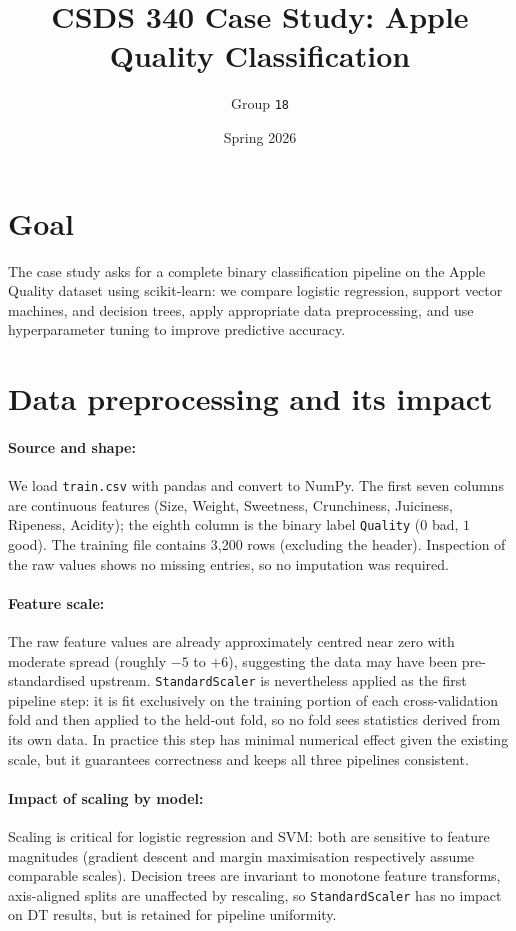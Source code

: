 \documentclass[11pt]{article}
\title{CSDS 340 Case Study: Apple Quality Classification}
\author{Group \texttt{18}}
\date{Spring 2026}
\begin{document}
\maketitle



\section{Goal}

The case study asks for a complete binary classification pipeline on the Apple Quality dataset using scikit-learn: we compare logistic regression, support vector machines, and decision trees, apply appropriate data preprocessing, and use hyperparameter tuning to improve predictive accuracy.


\section{Data preprocessing and its impact}

\paragraph{Source and shape:}
We load \texttt{train.csv} with pandas and convert to NumPy.
The first seven columns are continuous features (Size, Weight, Sweetness, Crunchiness, Juiciness, Ripeness, Acidity); the eighth column is the binary label \texttt{Quality} ($0$ bad, $1$ good).
The training file contains 3{,}200 rows (excluding the header).
Inspection of the raw values shows no missing entries, so no imputation was required.

\paragraph{Feature scale:}
The raw feature values are already approximately centred near zero with moderate spread (roughly $-5$ to $+6$), suggesting the data may have been pre-standardised upstream.
\texttt{StandardScaler} is nevertheless applied as the first pipeline step: it is fit exclusively on the training portion of each cross-validation fold and then applied to the held-out fold, so no fold sees statistics derived from its own data.
In practice this step has minimal numerical effect given the existing scale, but it guarantees correctness and keeps all three pipelines consistent.

\paragraph{Impact of scaling by model:}
Scaling is critical for logistic regression and SVM: both are sensitive to feature magnitudes (gradient descent and margin maximisation respectively assume comparable scales).
Decision trees are invariant to monotone feature transforms, axis-aligned splits are unaffected by rescaling, so \texttt{StandardScaler} has no impact on DT results, but is retained for pipeline uniformity.
\end{document}
